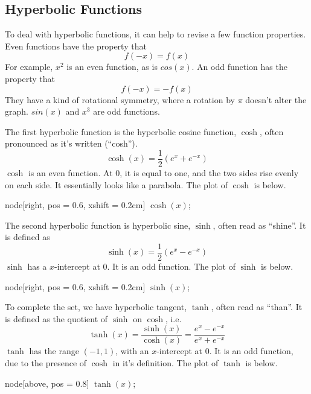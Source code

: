 \documentclass[12pt]{report}
\begin{document}
\begin{flushleft}
\section*{Hyperbolic Functions}

To deal with hyperbolic functions, it can help to revise a few function 
properties. Even functions have the property that
\[f(-x) = f(x)\]
For example, \(x^2\) is an even function, as is \(cos(x)\). An odd function
has the property that
\[f(-x) = -f(x)\]
They have a kind of rotational symmetry, where a rotation by \(\pi\) doesn't
alter the graph. \(sin(x)\) and \(x^3\) are odd functions.

\bigskip
The first hyperbolic function is the hyperbolic cosine function, \(\cosh\), 
often pronounced as it's written (``cosh'').
\[\cosh(x) = \frac{1}{2}(e^x + e^{-x})\]
\(\cosh\) is an even function. At \(0\), it is equal to one, and the two sides
rise evenly on each side. It essentially looks like a parabola. 
The plot of \(\cosh\) is below.

\begin{plot}[
    xmin = -3,
    xmax = 3,
    ymin = -1,
    ymax = 6
]
    node[right, pos = 0.6, xshift = 0.2cm] {\(\cosh(x)\)};
\end{plot}

The second hyperbolic function is hyperbolic sine, \(\sinh\), often read as
``shine''. It is defined as
\[\sinh(x) = \frac{1}{2}(e^x - e^{-x})\]
\(\sinh\) has a \(x\)-intercept at \(0\). It is an odd function. The plot of
\(\sinh\) is below.

\begin{plot}[
    xmin = -3,
    xmax = 3,
    ymin = -6,
    ymax = 6
]
    node[right, pos = 0.6, xshift = 0.2cm] {\(\sinh(x)\)};
\end{plot}

To complete the set, we have hyperbolic tangent, \(\tanh\), often read as 
``than''. It is defined as the quotient of \(\sinh\) on \(\cosh\), i.e.
\[\tanh(x) = \frac{\sinh(x)}{\cosh(x)} = \frac{e^x - e^{-x}}{e^x + e^{-x}}\]
\(\tanh\) has the range \((-1, 1)\), with an \(x\)-intercept at \(0\). It is an
odd function, due to the presence of \(\cosh\) in it's definition. The plot of
\(\tanh\) is below.

\begin{plot}[
    xmin = -5,
    xmax = 5,
    ymin = -2,
    ymax = 2
]
    node[above, pos = 0.8] {\(\tanh(x)\)};
\end{plot}


\end{flushleft}
\end{document}

